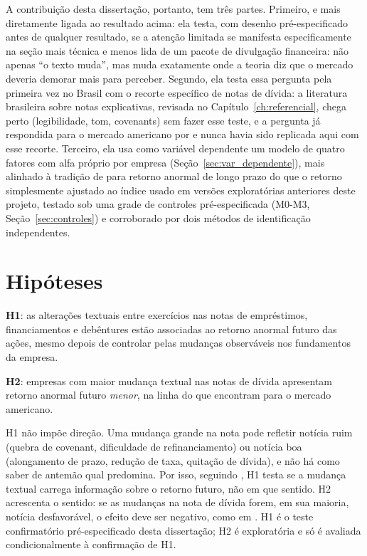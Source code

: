 \documentclass[a4paper,12pt]{report}
\begin{document}
A contribuição desta dissertação, portanto, tem três partes. Primeiro, e mais diretamente ligada ao resultado acima: ela testa, com desenho pré-especificado antes de qualquer resultado, se a atenção limitada se manifesta especificamente na seção mais técnica e menos lida de um pacote de divulgação financeira: não apenas ``o texto muda'', mas muda exatamente onde a teoria diz que o mercado deveria demorar mais para perceber. Segundo, ela testa essa pergunta pela primeira vez no Brasil com o recorte específico de notas de dívida: a literatura brasileira sobre notas explicativas, revisada no Capítulo~\ref{ch:referencial}, chega perto (legibilidade, tom, covenants) sem fazer esse teste, e a pergunta já respondida para o mercado americano por  e  nunca havia sido replicada aqui com esse recorte. Terceiro, ela usa como variável dependente um modelo de quatro fatores com alfa próprio por empresa (Seção~\ref{sec:var_dependente}), mais alinhado à tradição de  para retorno anormal de longo prazo do que o retorno simplesmente ajustado ao índice usado em versões exploratórias anteriores deste projeto, testado sob uma grade de controles pré-especificada (M0-M3, Seção~\ref{sec:controles}) e corroborado por dois métodos de identificação independentes.

\section{Hipóteses}
\label{sec:hipoteses}

\textbf{H1}: as alterações textuais entre exercícios nas notas de empréstimos, financiamentos e debêntures estão associadas ao retorno anormal futuro das ações, mesmo depois de controlar pelas mudanças observáveis nos fundamentos da empresa.

\textbf{H2}: empresas com maior mudança textual nas notas de dívida apresentam retorno anormal futuro \emph{menor}, na linha do que  encontram para o mercado americano.

\vspace{\baselineskip}
H1 não impõe direção. Uma mudança grande na nota pode refletir notícia ruim (quebra de covenant, dificuldade de refinanciamento) ou notícia boa (alongamento de prazo, redução de taxa, quitação de dívida), e não há como saber de antemão qual predomina. Por isso, seguindo , H1 testa se a mudança textual carrega informação sobre o retorno futuro, não em que sentido. H2 acrescenta o sentido: se as mudanças na nota de dívida forem, em sua maioria, notícia desfavorável, o efeito deve ser negativo, como em . H1 é o teste confirmatório pré-especificado desta dissertação; H2 é exploratória e só é avaliada condicionalmente à confirmação de H1.
\end{document}
